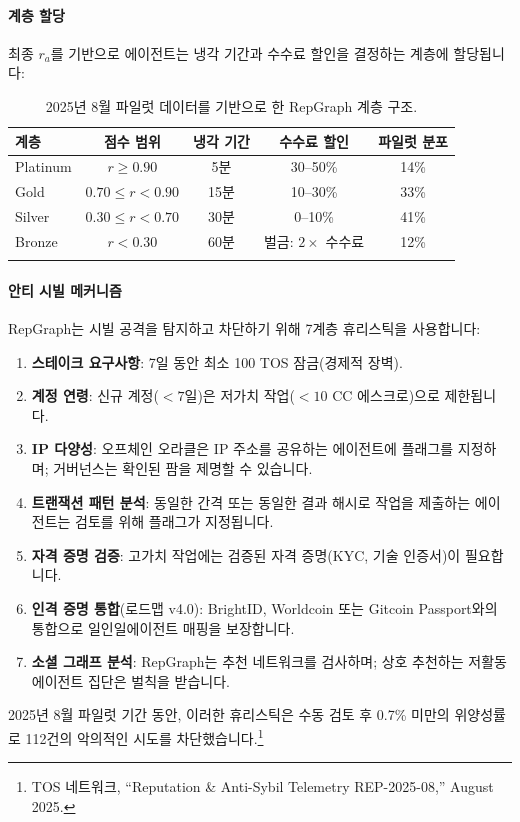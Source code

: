 \documentclass[11pt]{article}
\begin{document}
\paragraph{계층 할당} 최종 $r_a$를 기반으로 에이전트는 냉각 기간과 수수료 할인을 결정하는 계층에 할당됩니다:
\begin{longtable}{@{}lcccc@{}}
\toprule
\textbf{계층} & \textbf{점수 범위} & \textbf{냉각 기간} & \textbf{수수료 할인} & \textbf{파일럿 분포} \\\midrule
Platinum & $r \geq 0.90$ & 5분 & 30--50\% & 14\% \\
Gold & $0.70 \leq r < 0.90$ & 15분 & 10--30\% & 33\% \\
Silver & $0.30 \leq r < 0.70$ & 30분 & 0--10\% & 41\% \\
Bronze & $r < 0.30$ & 60분 & 벌금: $2 \times$ 수수료 & 12\% \\\bottomrule
\caption{2025년 8월 파일럿 데이터를 기반으로 한 RepGraph 계층 구조.}
\label{tab:reputation-tiers}
\end{longtable}

\paragraph{안티 시빌 메커니즘} RepGraph는 시빌 공격을 탐지하고 차단하기 위해 7계층 휴리스틱을 사용합니다:
\begin{enumerate}[noitemsep]
  \item \textbf{스테이크 요구사항}: 7일 동안 최소 100 TOS 잠금(경제적 장벽).
  \item \textbf{계정 연령}: 신규 계정($<7$일)은 저가치 작업($<10$ CC 에스크로)으로 제한됩니다.
  \item \textbf{IP 다양성}: 오프체인 오라클은 IP 주소를 공유하는 에이전트에 플래그를 지정하며; 거버넌스는 확인된 팜을 제명할 수 있습니다.
  \item \textbf{트랜잭션 패턴 분석}: 동일한 간격 또는 동일한 결과 해시로 작업을 제출하는 에이전트는 검토를 위해 플래그가 지정됩니다.
  \item \textbf{자격 증명 검증}: 고가치 작업에는 검증된 자격 증명(KYC, 기술 인증서)이 필요합니다.
  \item \textbf{인격 증명 통합}(로드맵 v4.0): BrightID, Worldcoin 또는 Gitcoin Passport와의 통합으로 일인일에이전트 매핑을 보장합니다.
  \item \textbf{소셜 그래프 분석}: RepGraph는 추천 네트워크를 검사하며; 상호 추천하는 저활동 에이전트 집단은 벌칙을 받습니다.
\end{enumerate}
2025년 8월 파일럿 기간 동안, 이러한 휴리스틱은 수동 검토 후 0.7\% 미만의 위양성률로 112건의 악의적인 시도를 차단했습니다.\footnote{TOS 네트워크, ``Reputation \& Anti-Sybil Telemetry REP-2025-08,'' August 2025.}
\end{document}
